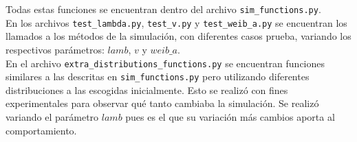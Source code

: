 \documentclass{article}
\begin{document}
 Todas estas funciones se encuentran dentro del archivo \texttt{sim\_functions.py}.\\
 En los archivos \texttt{test\_lambda.py}, \texttt{test\_v.py} y \texttt{test\_weib\_a.py} se encuentran los llamados a los métodos de la simulación, con diferentes casos prueba, variando los respectivos parámetros: $lamb$, $v$ y $weib\_a$.\\
 En el archivo \texttt{extra\_distributions\_functions.py} se encuentran funciones similares a las descritas en \texttt{sim\_functions.py} pero utilizando diferentes distribuciones a las escogidas inicialmente. Esto se realizó con fines experimentales para observar qué tanto cambiaba la simulación. Se realizó variando el parámetro $lamb$ pues es el que su variación más cambios aporta al comportamiento. 
\end{document}
